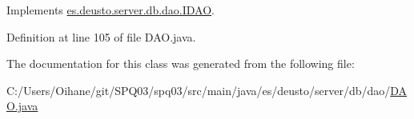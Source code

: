Implements \hyperlink{interfacees_1_1deusto_1_1server_1_1db_1_1dao_1_1_i_d_a_o_a790b00e2989b634c1bbb2c6620ff3583}{es.\+deusto.\+server.\+db.\+dao.\+I\+D\+AO}.



Definition at line 105 of file D\+A\+O.\+java.



The documentation for this class was generated from the following file\+:\begin{DoxyCompactItemize}
\item 
C\+:/\+Users/\+Oihane/git/\+S\+P\+Q03/spq03/src/main/java/es/deusto/server/db/dao/\hyperlink{_d_a_o_8java}{D\+A\+O.\+java}\end{DoxyCompactItemize}
